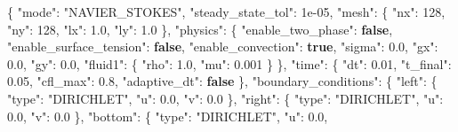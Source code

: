 \documentclass[
  10pt,
]{article}
\newenvironment{Shaded}{}{}
\newcommand{\DataTypeTok}[1]{\textcolor[rgb]{0.56,0.13,0.00}{#1}}
\newcommand{\DecValTok}[1]{\textcolor[rgb]{0.25,0.63,0.44}{#1}}
\newcommand{\FloatTok}[1]{\textcolor[rgb]{0.25,0.63,0.44}{#1}}
\newcommand{\FunctionTok}[1]{\textcolor[rgb]{0.02,0.16,0.49}{#1}}
\newcommand{\KeywordTok}[1]{\textcolor[rgb]{0.00,0.44,0.13}{\textbf{#1}}}
\newcommand{\StringTok}[1]{\textcolor[rgb]{0.25,0.44,0.63}{#1}}
\begin{document}
\begin{Shaded}
\begin{Highlighting}[]
\FunctionTok{\{}
  \DataTypeTok{"mode"}\FunctionTok{:} \StringTok{"NAVIER\_STOKES"}\FunctionTok{,}
  \DataTypeTok{"steady\_state\_tol"}\FunctionTok{:} \DecValTok{1e{-}05}\FunctionTok{,}
  \DataTypeTok{"mesh"}\FunctionTok{:} \FunctionTok{\{}
    \DataTypeTok{"nx"}\FunctionTok{:} \DecValTok{128}\FunctionTok{,}
    \DataTypeTok{"ny"}\FunctionTok{:} \DecValTok{128}\FunctionTok{,}
    \DataTypeTok{"lx"}\FunctionTok{:} \FloatTok{1.0}\FunctionTok{,}
    \DataTypeTok{"ly"}\FunctionTok{:} \FloatTok{1.0}
  \FunctionTok{\},}
  \DataTypeTok{"physics"}\FunctionTok{:} \FunctionTok{\{}
    \DataTypeTok{"enable\_two\_phase"}\FunctionTok{:} \KeywordTok{false}\FunctionTok{,}
    \DataTypeTok{"enable\_surface\_tension"}\FunctionTok{:} \KeywordTok{false}\FunctionTok{,}
    \DataTypeTok{"enable\_convection"}\FunctionTok{:} \KeywordTok{true}\FunctionTok{,}
    \DataTypeTok{"sigma"}\FunctionTok{:} \FloatTok{0.0}\FunctionTok{,}
    \DataTypeTok{"gx"}\FunctionTok{:} \FloatTok{0.0}\FunctionTok{,}
    \DataTypeTok{"gy"}\FunctionTok{:} \FloatTok{0.0}\FunctionTok{,}
    \DataTypeTok{"fluid1"}\FunctionTok{:} \FunctionTok{\{}
      \DataTypeTok{"rho"}\FunctionTok{:} \FloatTok{1.0}\FunctionTok{,}
      \DataTypeTok{"mu"}\FunctionTok{:} \FloatTok{0.001}
    \FunctionTok{\}}
  \FunctionTok{\},}
  \DataTypeTok{"time"}\FunctionTok{:} \FunctionTok{\{}
    \DataTypeTok{"dt"}\FunctionTok{:} \FloatTok{0.01}\FunctionTok{,}
    \DataTypeTok{"t\_final"}\FunctionTok{:} \FloatTok{0.05}\FunctionTok{,}
    \DataTypeTok{"cfl\_max"}\FunctionTok{:} \FloatTok{0.8}\FunctionTok{,}
    \DataTypeTok{"adaptive\_dt"}\FunctionTok{:} \KeywordTok{false}
  \FunctionTok{\},}
  \DataTypeTok{"boundary\_conditions"}\FunctionTok{:} \FunctionTok{\{}
    \DataTypeTok{"left"}\FunctionTok{:} \FunctionTok{\{}
      \DataTypeTok{"type"}\FunctionTok{:} \StringTok{"DIRICHLET"}\FunctionTok{,}
      \DataTypeTok{"u"}\FunctionTok{:} \FloatTok{0.0}\FunctionTok{,}
      \DataTypeTok{"v"}\FunctionTok{:} \FloatTok{0.0}
    \FunctionTok{\},}
    \DataTypeTok{"right"}\FunctionTok{:} \FunctionTok{\{}
      \DataTypeTok{"type"}\FunctionTok{:} \StringTok{"DIRICHLET"}\FunctionTok{,}
      \DataTypeTok{"u"}\FunctionTok{:} \FloatTok{0.0}\FunctionTok{,}
      \DataTypeTok{"v"}\FunctionTok{:} \FloatTok{0.0}
    \FunctionTok{\},}
    \DataTypeTok{"bottom"}\FunctionTok{:} \FunctionTok{\{}
      \DataTypeTok{"type"}\FunctionTok{:} \StringTok{"DIRICHLET"}\FunctionTok{,}
      \DataTypeTok{"u"}\FunctionTok{:} \FloatTok{0.0}\FunctionTok{,}

\end{Highlighting}
\end{Shaded}
\end{document}
